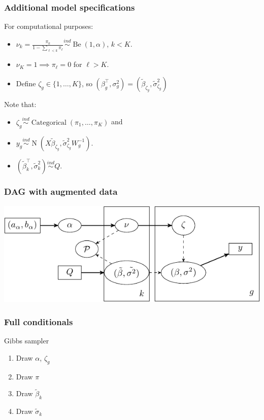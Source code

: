 \documentclass{beamer}
\newcommand{\op}{\operatorname}
\newcommand{\ind}{\stackrel{ind}{\sim}}
\begin{document}
\begin{frame}%
  \frametitle{Additional model specifications}
  \centering
    \begin{beamerboxesrounded}[upper=upcol,lower=lowcol,shadow=true]{For computational purposes:}
      \begin{itemize}
        \item $\nu_k = \frac{\pi_k}{1-\sum_{\ell<k} \pi_\ell} \ind \op{Be}(1,\alpha)$, $k<K$.
        \pause \item $\nu_K = 1 \implies \pi_\ell =0$ for $\ell>K$.
        \pause \item Define $\zeta_g \in \{1,\ldots,K\}$, so $(\beta_g^\top,\sigma_g^2) = (\tilde{\beta}_{\zeta_g},\tilde{\sigma}_{\zeta_g}^2)$ \pause 
      \end{itemize}
      Note that:
      \begin{itemize}
        \item $\zeta_g \ind \op{Categorical}(\pi_1,\ldots,\pi_K)$ \pause and
        \item $y_g \ind \op{N}(X\tilde{\beta}_{\zeta_g},\tilde{\sigma}_{\zeta_g}^2 W_g^{-1})$.
        \item $(\tilde{\beta}_k^\top,\tilde{\sigma}^2_k) \ind Q$.
      \end{itemize}
      
      
      {\scriptsize \citep{ishwaran2000}}
    \end{beamerboxesrounded}
\end{frame}

\begin{frame}%
  \frametitle{DAG with augmented data}
  \includegraphics[width=\textwidth]{my_dag_small}
\end{frame}

\begin{frame}%
  \frametitle{Full conditionals}
  \begin{beamerboxesrounded}[upper=upcol,lower=lowcol,shadow=true]{Gibbs sampler}
    \begin{enumerate}
      \item Draw $\alpha$, $\zeta_g$
      \item Draw $\pi$
      \item Draw $\tilde{\beta}_k$
      \item Draw $\tilde{\sigma}_k$
    \end{enumerate}
  \end{beamerboxesrounded}
\end{frame}
\end{document}
